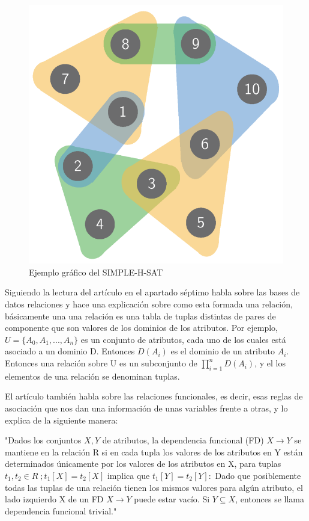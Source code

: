 \documentclass{cosas/tfg_domingo}
\begin{document}
\begin{figure}[ht!] %
\begin{center}
\includegraphics[width=0.4\linewidth]{imagenes/S-H-SAT.png}
\end{center}
\caption{Ejemplo gráfico del SIMPLE-H-SAT}
\label{SHSAT}
\end{figure}

Siguiendo la lectura del artículo en el apartado séptimo habla sobre las bases de datos relaciones y hace una explicación sobre como esta formada una relación, básicamente una una relación es una tabla de tuplas distintas de pares de componente que son valores de los dominios de los atributos. Por ejemplo, $U = \{A_0,A_1,...,A_n\}$ es un conjunto de atributos, cada uno de los cuales está asociado a un dominio D. Entonces $D(A_i)$ es el dominio de un atributo $A_i$. 
Entonces una relación sobre U es un subconjunto de $\prod_{i=1}^{n}D(A_i)$, y el los elementos de una relación se denominan tuplas.

El artículo también habla sobre las relaciones funcionales, es decir, esas reglas de asociación que nos dan una información de unas variables frente a otras, y lo explica de la siguiente manera:

"Dados los conjuntos $ X, Y $ de atributos, la dependencia funcional (FD) $ X \rightarrow Y $ se mantiene en la relación R si en cada tupla los valores de los atributos en Y están determinados únicamente por los valores de los atributos en X, para tuplas $ t_1 , t_2 \in R \;; t_1 [X] = t_2 [X] $ implica que $ t_1 [Y] = t_2 [Y]: $ Dado que posiblemente todas las tuplas de una relación tienen los mismos valores para algún atributo, el lado izquierdo X de un FD $ X \rightarrow Y $ puede estar vacío. Si $Y \subseteq X$, entonces se llama dependencia funcional trivial."

\newpage
\end{document}
